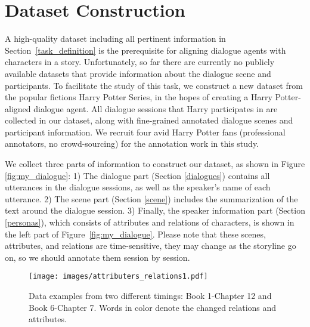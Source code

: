 \documentclass[11pt]{article}
\begin{document}
 








\section{Dataset Construction}
\label{dataset_collection}

A high-quality dataset including all pertinent information in Section~\ref{task_definition} is the prerequisite for aligning dialogue agents with characters in a story. Unfortunately, so far there are currently no publicly available datasets that provide information about the dialogue scene and participants. To facilitate the study of this task, we construct a new dataset from the popular fictions Harry Potter Series, in the hopes of creating a Harry Potter-aligned dialogue agent. All dialogue sessions that Harry participates in are collected in our dataset, along with fine-grained annotated dialogue scenes and participant information. We recruit four avid  Harry Potter fans (professional annotators, no crowd-sourcing) for the annotation work in this study.




We collect three parts of information to construct our dataset, as shown in Figure \ref{fig:my_dialogue}:
1) The dialogue part (Section \ref{dialogues}) contains all utterances in the dialogue sessions, as well as the speaker's name of each utterance. 2) The scene part (Section \ref{scene}) includes the summarization of the text around the dialogue session. 3) Finally, the speaker information part (Section \ref{personas}), which consists of attributes and relations of characters, is shown in the left part of Figure~\ref{fig:my_dialogue}.
Please note that these scenes, attributes, and relations are time-sensitive, they may change as the storyline go on, 
so we should annotate them session by session.















\begin{figure*}
    \centering
    \texttt{[image: images/attributers\_relations1.pdf]}
    \caption{Data examples from two different timings: Book 1-Chapter 12 and Book 6-Chapter 7. Words in color denote the changed relations and attributes.}
\vspace{-10pt}
    \label{fig:attributes_relations}
\end{figure*}
\end{document}
